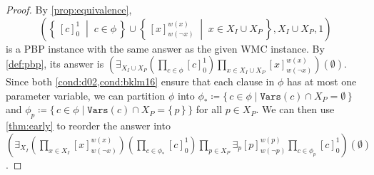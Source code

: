 \begin{proof}
  By \cref{prop:equivalence},
  \begin{equation}
    \left( \left\{\, {[c]}_{0}^{1} \;\middle|\; c \in \phi \,\right\} \cup \left\{\, {[x]}_{w(\neg x)}^{w(x)} \;\middle|\; x \in X_I \cup X_P \,\right\}, X_I \cup X_P, 1\right) \label{eq:new_wmc2}
  \end{equation}
  is a PBP instance with the same answer as the given WMC instance. By
  \cref{def:pbp}, its answer is
  $\left(\exists_{X_I \cup X_P} \left(\prod_{c \in \phi} {[c]}_0^1 \right) \prod_{x \in X_I \cup X_P} {[x]}_{w(\neg x)}^{w(x)} \right)(\emptyset)$.
  Since both \cref{cond:d02,cond:bklm16} ensure that each clause in $\phi$ has
  at most one parameter variable, we can partition $\phi$ into
  $\phi_* \coloneqq \{\, c \in \phi \mid \mathtt{Vars}(c) \cap X_P = \emptyset \,\}$
  and
  $\phi_p \coloneqq \{\, c \in \phi \mid \mathtt{Vars}(c) \cap X_P = \{\, p \,\} \,\}$
  for all $p \in X_P$. We can then use \cref{thm:early} to reorder the answer
  into
  $\left(\exists_{X_I} \left( \prod_{x \in X_I} {[x]}_{w(\neg x)}^{w(x)} \right) \left( \prod_{c \in \phi_*} {[c]}_0^1 \right) \prod_{p \in X_P} \exists_p {[p]}_{w(\neg p)}^{w(p)} \prod_{c \in \phi_p} {[c]}_0^1 \right)(\emptyset)$.


\end{proof}
